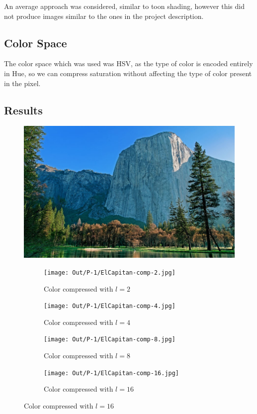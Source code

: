 \documentclass[dvipsnames]{article}
\begin{document}
An average approach was considered, similar to toon shading, however this did not produce images similar to the ones in the project description.

\subsection*{Color Space}
The color space which was used was HSV, as the type of color is encoded entirely in Hue, so we can compress saturation without affecting the type of color present in the pixel.

\subsection*{Results}
\begin{figure}[H]
	\centering\includegraphics[width=.5\linewidth]{Images/P-1/ElCapitan.jpg}
	\caption{Original ElCapitan.jpg}

	\begin{subfigure}{.33\linewidth}
		\centering\texttt{[image: Out/P-1/ElCapitan-comp-2.jpg]}
		\caption{Color compressed with $l = 2$}
	\end{subfigure}
	\begin{subfigure}{.33\linewidth}
		\centering\texttt{[image: Out/P-1/ElCapitan-comp-4.jpg]}
		\caption{Color compressed with $l = 4$}
	\end{subfigure}
	\begin{subfigure}{.33\linewidth}
		\centering\texttt{[image: Out/P-1/ElCapitan-comp-8.jpg]}
		\caption{Color compressed with $l = 8$}
	\end{subfigure}
	\begin{subfigure}{.33\linewidth}
		\centering\texttt{[image: Out/P-1/ElCapitan-comp-16.jpg]}
		\caption{Color compressed with $l = 16$}
	\end{subfigure}
\end{figure}
\end{document}
